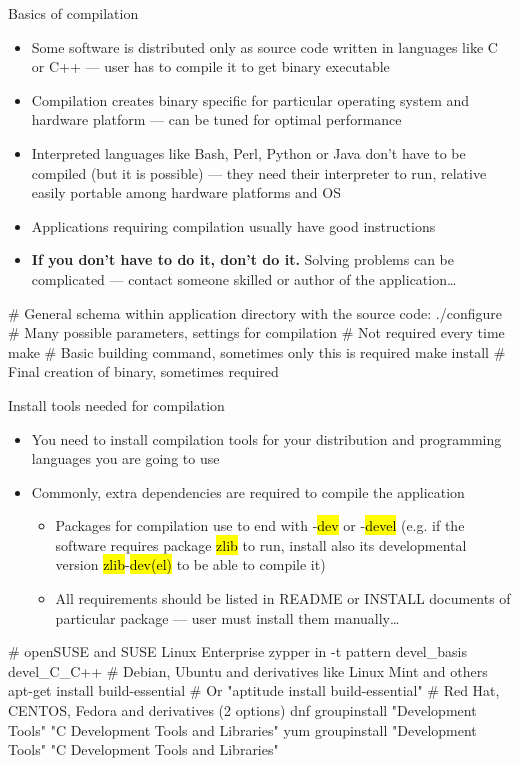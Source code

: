 \documentclass[compress, ucs, xelatex, 11pt, xcolor=svgnames, aspectratio=169,
	hyperref={
		bookmarks=true,
		unicode=true,
		colorlinks=true,
		pdftitle={Linux, command line and MetaCentrum},
		plainpages=false,
		pdfauthor={Vojtech Zeisek},
		pdfsubject={Course about use of Linux command line, writing shell scripts and using MetaCentrum of CESNET},
		pdfcreator={XeLaTeX},
		pdfkeywords={Linux, GNU, BASH, shell, command line, MetaCentrum},
		linkcolor=DarkRed, %
		anchorcolor=DarkBlue, %
		citecolor=Indigo, %
		filecolor=NavyBlue, %
		menucolor=DarkMagenta, %
		urlcolor=DarkBlue, %
		pdftex},
	url={hyphens, lowtilde} %
	]{beamer}
\renewcommand{\texttt}[1]{\hl{\ttfamily #1}}
\begin{document}
\begin{frame}[fragile]{Basics of compilation}
	\begin{itemize}
		\item Some software is distributed only as source code written in languages like C or C++ --- user has to compile it to get binary executable
		\item Compilation creates binary specific for particular operating system and hardware platform --- can be tuned for optimal performance
		\item Interpreted languages like Bash, Perl, Python or Java don't have to be compiled (but it is possible) --- they need their interpreter to run, relative easily portable among hardware platforms and OS
		\item Applications requiring compilation usually have good instructions
		\item \textbf{If you don't have to do it, don't do it.}\textbf{} Solving problems can be complicated --- contact someone skilled or author of the application\ldots
	\end{itemize}
	\begin{bashcode}
    # General schema within application directory with the source code:
    ./configure # Many possible parameters, settings for compilation
                # Not required every time
    make # Basic building command, sometimes only this is required
    make install # Final creation of binary, sometimes required
	\end{bashcode}
\end{frame}

\begin{frame}[fragile]{Install tools needed for compilation}
	\begin{itemize}
		\item You need to install compilation tools for your distribution and programming languages you are going to use
		\item Commonly, extra dependencies are required to compile the application
		\begin{itemize}
			\item Packages for compilation use to end with -\texttt{dev} or -\texttt{devel} (e.g. if the software requires package \texttt{zlib} to run, install also its developmental version \texttt{zlib}-\texttt{dev(el)} to be able to compile it)
			\item All requirements should be listed in README or INSTALL documents of particular package --- user must install them manually\ldots
		\end{itemize}
	\end{itemize}
	\vfill
	\begin{bashcode}
    # openSUSE and SUSE Linux Enterprise
    zypper in -t pattern devel_basis devel_C_C++
    # Debian, Ubuntu and derivatives like Linux Mint and others
    apt-get install build-essential # Or "aptitude install build-essential"
    # Red Hat, CENTOS, Fedora and derivatives (2 options)
    dnf groupinstall "Development Tools" "C Development Tools and Libraries"
    yum groupinstall "Development Tools" "C Development Tools and Libraries"
	\end{bashcode}
\end{frame}
\end{document}
